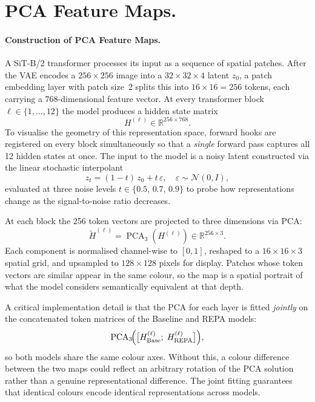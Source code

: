 \section{PCA Feature Maps.}
\label{app:feature_maps}

\paragraph{Construction of PCA Feature Maps.}

A SiT-B/2 transformer processes its input as a sequence of spatial patches.
After the VAE encodes a $256{\times}256$ image into a $32{\times}32{\times}4$
latent $z_0$, a patch embedding layer with patch size~2 splits this into
$16{\times}16 = 256$ tokens, each carrying a 768-dimensional feature vector.
At every transformer block $\ell \in \{1, \dots, 12\}$ the model produces a
hidden state matrix
\[
  H^{(\ell)} \in \mathbb{R}^{256 \times 768}.
\]
To visualise the geometry of this representation space, forward hooks are
registered on every block simultaneously so that a \emph{single} forward pass
captures all 12 hidden states at once. The input to the model is a noisy
latent constructed via the linear stochastic interpolant
\[
  z_t = (1 - t)\,z_0 + t\,\varepsilon, \quad
  \varepsilon \sim \mathcal{N}(0, I),
\]
evaluated at three noise levels $t \in \{0.5,\, 0.7,\, 0.9\}$ to probe how
representations change as the signal-to-noise ratio decreases.

At each block the 256 token vectors are projected to three dimensions via PCA:
\[
  \widetilde{H}^{(\ell)} = \operatorname{PCA}_3\!\left(H^{(\ell)}\right)
  \in \mathbb{R}^{256 \times 3}.
\]
Each component is normalised channel-wise to $[0, 1]$, reshaped to a
$16{\times}16{\times}3$ spatial grid, and upsampled to $128{\times}128$ pixels
for display. Patches whose token vectors are similar appear in the same colour,
so the map is a spatial portrait of what the model considers semantically
equivalent at that depth.

A critical implementation detail is that the PCA for each layer is fitted
\emph{jointly} on the concatenated token matrices of the Baseline and REPA
models:
\[
  \operatorname{PCA}_3\!\Bigl(
    \bigl[H^{(\ell)}_{\text{Base}};\; H^{(\ell)}_{\text{REPA}}\bigr]
  \Bigr),
\]
so both models share the same colour axes. Without this, a colour difference
between the two maps could reflect an arbitrary rotation of the PCA solution
rather than a genuine representational difference. The joint fitting guarantees
that identical colours encode identical representations across models.



